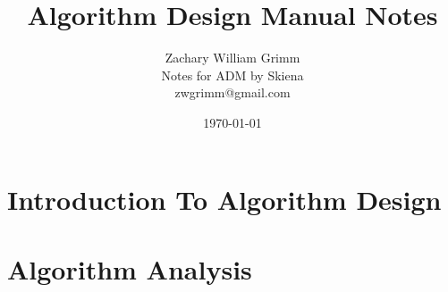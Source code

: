 \documentclass[10pt,letterpaper]{article}
\title{Algorithm Design Manual Notes}
\author{Zachary William Grimm\\
  \small{Notes  for ADM by Skiena}\\
  \small{zwgrimm@gmail.com}
}
\date{\today{}}
\begin{document}
\maketitle

\tableofcontents{}

\newpage{}
 

\section{Introduction To Algorithm Design}







\section{Algorithm Analysis}


















% 
\end{document}
